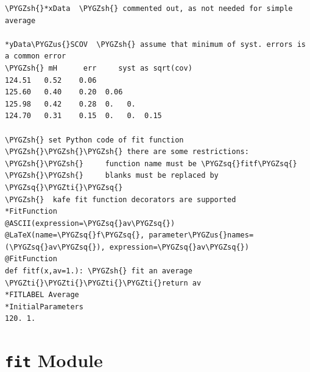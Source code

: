 \documentclass[a4paper,10pt,english]{sphinxmanual}
\def\PYGZus{\char`\_}
\def\PYGZsh{\char`\#}
\def\PYGZsq{\char`\'}
\def\PYGZti{\char`\~}
\renewcommand\PYGZsq{\textquotesingle}
\begin{document}
\begin{fulllineitems}
\begin{Verbatim}[commandchars=\\\{\}]
\PYGZsh{}*xData  \PYGZsh{} commented out, as not needed for simple average

*yData\PYGZus{}SCOV  \PYGZsh{} assume that minimum of syst. errors is a common error
\PYGZsh{} mH      err     syst as sqrt(cov)
124.51   0.52    0.06
125.60   0.40    0.20  0.06
125.98   0.42    0.28  0.   0.
124.70   0.31    0.15  0.   0.  0.15

\PYGZsh{} set Python code of fit function
\PYGZsh{}\PYGZsh{}\PYGZsh{} there are some restrictions:
\PYGZsh{}\PYGZsh{}     function name must be \PYGZsq{}fitf\PYGZsq{}
\PYGZsh{}\PYGZsh{}     blanks must be replaced by \PYGZsq{}\PYGZti{}\PYGZsq{}
\PYGZsh{}  kafe fit function decorators are supported
*FitFunction
@ASCII(expression=\PYGZsq{}av\PYGZsq{})
@LaTeX(name=\PYGZsq{}f\PYGZsq{}, parameter\PYGZus{}names=(\PYGZsq{}av\PYGZsq{}), expression=\PYGZsq{}av\PYGZsq{})
@FitFunction
def fitf(x,av=1.): \PYGZsh{} fit an average
\PYGZti{}\PYGZti{}\PYGZti{}\PYGZti{}return av
*FITLABEL Average
*InitialParameters
120. 1.
\end{Verbatim}

\end{fulllineitems}



\section{\texttt{fit} Module}
\label{index:fit-module}\label{index:module-kafe.fit}\label{index:module-fit}
\end{document}
